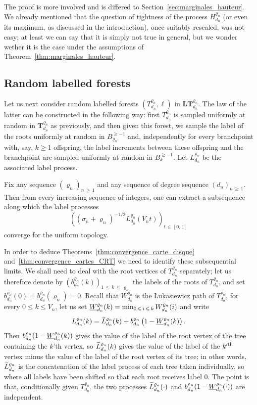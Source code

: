 \documentclass[AHL,Unicode,longabstracts,published]{cedram}
\newcommand{\1}{\ensembles{1}}
\newcommand{\tildep}[1]{\widetilde{#1}\vphantom{#1}}
\newcommand{\underlinep}[1]{\underline{#1}\vphantom{#1}}
\newcommand{\Tree}{\mathbf{T}}
\newcommand{\LTree}{\mathbf{LT}}
\renewcommand{\le}{\leqslant}
\renewcommand{\ge}{\geqslant}
\newcommand{\BBmap}{B}
\newcommand{\Fn}{\Tree_{d_n}^{\varrho_n}}
\newcommand{\fn}{T_{d_n}^{\varrho_n}}
\newcommand{\LFn}{\LTree_{d_n}^{\varrho_n}}
\newcommand{\Wfn}{W_{d_n}^{\varrho_n}}
\newcommand{\Hfn}{H_{d_n}^{\varrho_n}}
\newcommand{\Lfn}{L_{d_n}^{\varrho_n}}
\newcommand{\tLfn}{\tildep{L}_{d_n}^{\varrho_n}}
\newcommand{\bfn}{b_{d_n}^{\varrho_n}}
\newcommand{\infWfn}{\underlinep{W}_{d_n}^{\varrho_n}}
\newcommand{\vertices}{V}
\begin{document}
The proof is more involved and is differed to Section~\ref{sec:marginales_hauteur}. We already mentioned that the question of tightness of the process $\Hfn$ (or even its maximum, as discussed in the introduction), once suitably rescaled, was not easy; at least we can say that it is simply not true in general, but we wonder wether it is the case under the assumptions of Theorem~\ref{thm:marginales_hauteur}.



\subsection{Random labelled forests}\label{sec:enonce_tension_convergence_etiquettes}

Let us next consider random labelled forests $(\fn, \ell)$ in $\LFn$. The law of the latter can be constructed in the following way: first $\fn$ is sampled uniformly at random in $\Fn$ as previously, and then given this forest, we sample the label of the roots uniformly at random in $\BBmap_{\varrho_n}^{\ge -1}$ and, independently for every branchpoint with, say, $k \ge 1$ offspring, the label increments between these offspring and the branchpoint are sampled uniformly at random in $\BBmap_k^{\ge -1}$. Let $\Lfn$ be the associated label process.


\begin{theo}\label{thm:tension_etiquettes}
Fix any sequence $(\varrho_n)_{n\,\ge\,1}$ and any sequence of degree sequence $(d_n)_{n\,\ge\,1}$. Then from every increasing sequence of integers, one can extract a subsequence along which the label processes
\[
\left(\left(\sigma_n + \varrho_n\right)^{-1/2} \Lfn(\vertices_n t)\right)_{t \,\in\,[0,\,1]}
\]
converge for the uniform topology.
\end{theo}



In order to deduce Theorems~\ref{thm:convergence_carte_disque} and~\ref{thm:convergence_cartes_CRT} we need to identify these subsequential limits. We shall need to deal with the root vertices of $\fn$ separately; let us therefore denote by $(\bfn(k))_{1\,\le\,k\,\le\,\varrho_n}$ the labels of the roots of $\fn$, and set $\bfn(0) = \bfn(\varrho_n) = 0$. Recall that $\Wfn$ is the {\L}ukasiewicz path of $\fn$, for every $0 \le k \le \vertices_n$, let us set $\infWfn(k) = \min_{0\,\le\,i\,\le\,k} \Wfn(i)$ and write
\begin{equation}\label{eq:decomposition_labels}
\Lfn(k) = \tLfn(k) + \bfn\left(1-\infWfn(k)\right).
\end{equation}
Then $\bfn(1-\infWfn(k))$ gives the value of the label of the root vertex of the tree containing the $k$'th vertex, so $\tLfn(k)$ gives the value of the label of the $k'^{\rm th}$ vertex minus the value of the label of the root vertex of its tree; in other words, $\tLfn$ is the concatenation of the label process of each tree taken individually, so where all labels have been shifted so that each root receives label $0$. The point is that, conditionally given $\fn$, the two processes $\tLfn(\cdot)$ and $\bfn(1-\infWfn(\cdot))$ are independent.
\end{document}

